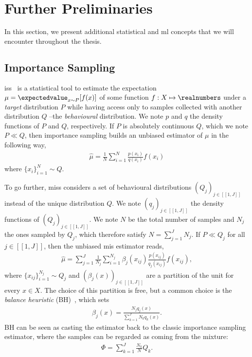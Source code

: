 \section{Further Preliminaries}
\label{sec:futher_prelim}
In this section, we present additional statistical and \gls{ml} concepts that we will encounter throughout the thesis. 


\subsection{Importance Sampling}
\label{subsec:importance_sampling}

\Glspl{is}~\cite{mcbook} is a statistical tool to estimate the expectation $\mu = \expectedvalue_{x \sim P}[f(x)]$ of some function $f:X\mapsto \realnumbers$ under a \emph{target} distribution $P$ while having access only to samples collected with another distribution $Q$ --the \emph{behavioural} distribution. 
We note $p$ and $q$ the density functions of $P$ and $Q$, respectively.
If $P$ is absolutely continuous \wrt $Q$, which we note $P \ll Q$, then importance sampling builds an unbiased estimator of $\mu$ in the following way,
\begin{align*}
    \widehat{\mu} = \frac{1}{N}\sum_{i=1}^{N} \frac{p(x_{i})}{q(x_{i})}f(x_{i})
\end{align*}
where $\{x_{i}\}_{i=1}^{N} \sim Q$. 

To go further, {\glspl{mis}} considers a set of behavioural distributions $(Q_j)_{j\in[\![1,J]\!]}$ instead of the unique distribution $Q$. 
We note $(q_j)_{j\in[\![1,J]\!]}$ the density functions of $(Q_j)_{j\in[\![1,J]\!]}$.
We note $N$ be the total number of samples and $N_j$ the ones sampled by $Q_j$, which therefore satisfy $\textstyle N=\sum\nolimits_{j=1}^{J} N_j$. 
If $P \ll Q_j$ for all $j\in[\![1,J]\!]$, then the unbiased \gls{mis} estimator reads,
\begin{align*}
	\widehat{\mu} = \sum_{j=1}^J \frac{1}{N_j}\sum_{i=1}^{N_j} \beta_j(x_{ij})\frac{p(x_{ij})}{q_j(x_{ij})}f(x_{ij}),
\end{align*}
where $\{x_{ij}\}_{i=1}^{N_j} \sim Q_j$ and $(\beta_j(x))_{j\in[\![1,J]\!]}$
are a partition of the unit for every $x \in X$.
The choice of this partition is free, but a common choice is the \emph{balance heuristic} (BH)~\cite{veach1995monte}, which sets
\begin{align*}
    \beta_j(x)=\frac{N_j q_j(x)}{\sum_{k=1}^J N_k q_k(x)}.
\end{align*}
BH can be seen as casting the estimator back to the classic importance sampling estimator, where the samples can be regarded as coming from the mixture:
\begin{align*}
    \Phi = \sum_{k=1}^J\frac{N_k}{N}Q_k.
\end{align*} 


